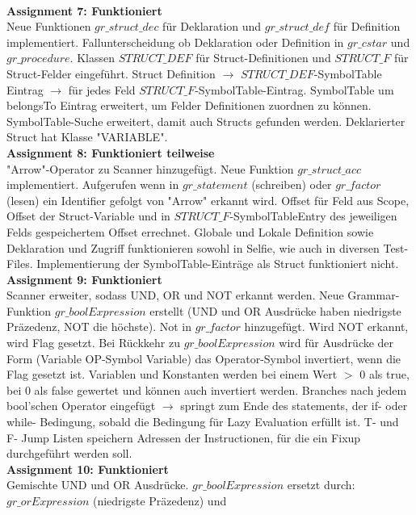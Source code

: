 \documentclass[10pt, a4paper]{article}
\begin{document}
\\
\textbf{Assignment 7: Funktioniert}\\
Neue Funktionen $gr\_struct\_dec$ für Deklaration und $gr\_struct\_def$ für Definition implementiert. Fallunterscheidung ob Deklaration oder Definition in $gr\_cstar$ und $gr\_procedure$. Klassen $STRUCT\_DEF$ für Struct-Definitionen und $STRUCT\_F$ für Struct-Felder eingeführt. Struct Definition $\rightarrow$ $STRUCT\_DEF$-SymbolTable Eintrag $\rightarrow$ für jedes Feld $STRUCT\_F$-SymbolTable-Eintrag. SymbolTable um belongsTo Eintrag erweitert, um Felder Definitionen zuordnen zu können. SymbolTable-Suche erweitert, damit auch Structs gefunden werden. Deklarierter Struct hat Klasse "VARIABLE".
\\
\textbf{Assignment 8: Funktioniert teilweise}\\
"Arrow"-Operator zu Scanner hinzugefügt. Neue Funktion $gr\_struct\_acc$ implementiert. Aufgerufen wenn in $gr\_statement$ (schreiben) oder $gr\_factor$ (lesen) ein Identifier gefolgt von "Arrow" erkannt wird. Offset für Feld aus Scope, Offset der Struct-Variable und in $STRUCT\_F$-SymbolTableEntry des jeweiligen Felds gespeichertem Offset errechnet.
Globale und Lokale Definition sowie Deklaration und Zugriff funktionieren sowohl in Selfie, wie auch in diversen Test-Files. Implementierung der SymbolTable-Einträge als Struct funktioniert nicht. 
\\
\textbf{Assignment 9: Funktioniert}\\
Scanner erweiter, sodass UND, OR und NOT erkannt werden. Neue Grammar-Funktion $gr\_boolExpression$ erstellt (UND und OR Ausdrücke haben niedrigste Präzedenz, NOT die höchste). Not in $gr\_factor$ hinzugefügt. Wird NOT erkannt, wird Flag gesetzt. Bei Rückkehr zu $gr\_boolExpression$ wird für Ausdrücke der Form (Variable OP-Symbol Variable) das Operator-Symbol invertiert, wenn die Flag gesetzt ist. Variablen und Konstanten werden bei einem Wert $>$ 0 als true, bei 0 als false gewertet und können auch invertiert werden. Branches nach jedem bool'schen Operator eingefügt $\rightarrow$ springt zum Ende des statements, der if- oder while- Bedingung, sobald die Bedingung für Lazy Evaluation erfüllt ist. T- und F- Jump Listen speichern Adressen der Instructionen, für die ein Fixup durchgeführt werden soll.
\\
\textbf{Assignment 10: Funktioniert}\\
Gemischte UND und OR Ausdrücke. $gr\_boolExpression$ ersetzt durch: $gr\_orExpression$ (niedrigste Präzedenz) und \\
\end{document}
